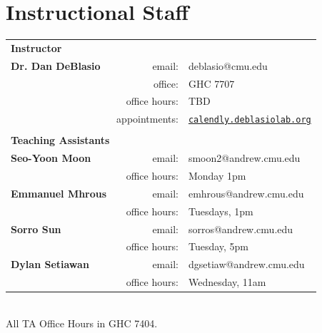 \section{Instructional Staff}

\begin{tabular}{lrl}
\multicolumn{3}{l}{\Large \textbf{Instructor}}\vspace{0.75em}\\
\textbf{Dr. Dan DeBlasio}  
 & email: & deblasio@cmu.edu\\
 & office: & GHC 7707\\
& office hours:& TBD \\
& appointments: & \href{http://calendly.deblasiolab.org}{\texttt{calendly.deblasiolab.org}} \vspace{0.5em}\\

\\
\multicolumn{3}{l}{\Large \textbf{Teaching Assistants}}\vspace{0.75em}\\
%
\textbf{Seo-Yoon Moon}
& email: & smoon2@andrew.cmu.edu\\
& office hours:& Monday 1pm \vspace{1em}\\

\textbf{Emmanuel Mhrous}
& email: & emhrous@andrew.cmu.edu\\
& office hours:& Tuesdays, 1pm \vspace{1em}\\
\textbf{Sorro Sun}
& email: & sorros@andrew.cmu.edu\\
& office hours:& Tuesday, 5pm \vspace{1em}\\


\textbf{Dylan Setiawan}
& email: & dgsetiaw@andrew.cmu.edu\\
& office hours:& Wednesday, 11am \vspace{1em}


\end{tabular}\\
All TA Office Hours in GHC 7404. 